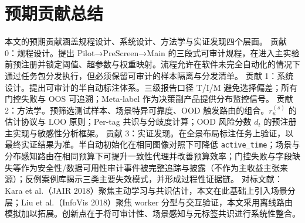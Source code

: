 ﻿\section{预期贡献总结}

本文的预期贡献涵盖规程设计、系统设计、方法学与实证发现四个层面。
贡献 0：规程设计。提出 Pilot→PreScreen→Main 的三段式可审计规程，在进入主实验前预注册并锁定阈值、超参数与权重映射。流程允许在软件未完全自动化的情况下通过任务包分发执行，但必须保留可审计的样本隔离与分发清单。
贡献 1：系统设计。提出可审计的半自动标注体系。三级报告口径 T/I/M 避免选择偏差；所有门控失败与 OOS 可追溯；Meta-label 作为决策副产品提供分布监控信号。
贡献 2：方法学。预筛选测试样本、场景特异可靠度、OOD 触发路由的组合。$r_{u}^{(s)}$ 的估计协议与 LOO 原则；Per-tag 共识与分歧度计算；OOD 风险分数 $d_{t}$ 的预注册主实现与敏感性分析框架。
贡献 3：实证发现。在全景布局标注任务上验证，以最终实证结果为准。半自动初始化在相同图像对照下可降低 \texttt{active\_time}；场景与分布感知路由在相同预算下可提升一致性代理并改善预算效率；门控失败与字段缺失等作为安全性/数据可用性审计事件被完整追踪与披露（不作为主收益主张来源）；反例案例库揭示三类主要失效模式，并形成过程性证据链。
对标文献：Kara et al.（JAIR 2018）聚焦主动学习与共识估计，本文在此基础上引入场景分层；Liu et al.（InfoVis 2018）聚焦 worker 分型与交互验证，本文采用离线路由模拟加以拓展。创新点在于将可审计性、场景感知与元标签共识进行系统性整合。


